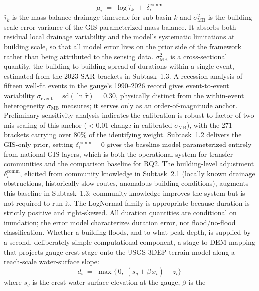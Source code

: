 \documentclass[11pt]{article}
\begin{document}
\begin{equation}\label{eq:mu}
  \mu_i \;=\; \log \hat{\tau}_k \;+\; \delta_i^{\mathrm{comm}}
\end{equation}
$\hat{\tau}_k$ is the mass balance drainage timescale for sub-basin $k$ and
$\sigma_{\mathrm{MB}}^2$ is the building-scale error variance of the
GIS-parameterized mass balance. It absorbs both residual local drainage
variability and the model's systematic limitations at building scale, so that
all model error lives on the prior side of the framework rather than being
attributed to the sensing data.
$\sigma_{\mathrm{MB}}^2$ is a cross-sectional quantity, the building-to-building
spread of durations within a single event, estimated from the 2023 SAR brackets
in Subtask~1.3. A recession analysis of fifteen well-fit events in the gauge's
1990--2026 record gives event-to-event variability
$\sigma_{\mathrm{event}} = \mathrm{sd}(\ln \hat{\tau}) = 0.30$, physically distinct
from the within-event heterogeneity $\sigma_{\mathrm{MB}}$ measures; it serves only
as an order-of-magnitude anchor. Preliminary sensitivity analysis indicates the calibration is
robust to factor-of-two mis-scaling of this anchor ($<$0.01 change in calibrated
$\sigma_{\mathrm{MB}}$), with the 271 brackets carrying over 80\% of the
identifying weight.
Subtask~1.2 delivers the GIS-only prior, setting $\delta_i^{\mathrm{comm}} = 0$
gives the baseline model parameterized entirely from national GIS layers, which
is both the operational system for transfer communities and the comparison
baseline for RQ2.
The building-level adjustment $\delta_i^{\mathrm{comm}}$, elicited from community
knowledge in Subtask~2.1 (locally known drainage obstructions, historically slow
routes, anomalous building conditions), augments this baseline in Subtask~1.3;
community knowledge improves the system but is not required to run it.
The LogNormal family is appropriate because duration is strictly positive and right-skewed. All duration quantities are conditional on inundation; the error model characterizes duration error, not flood/no-flood classification.
Whether a building floods, and to what peak depth, is supplied by a second,
deliberately simple computational component, a stage-to-DEM mapping that projects
gauge crest stage onto the USGS 3DEP terrain model along a reach-scale
water-surface slope:
\begin{equation}\label{eq:stagedem}
  d_i \;=\; \max\bigl\{\,0,\; (s_g + \beta\, x_i) - z_i \bigr\}
\end{equation}
where $s_g$ is the crest water-surface elevation at the gauge, $\beta$ is the
\end{document}
